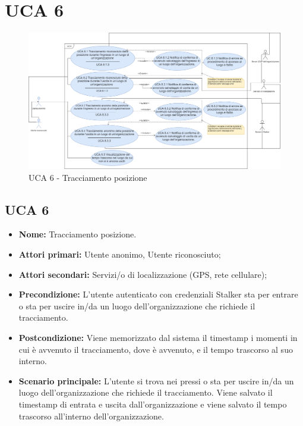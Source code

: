 \newpage
\section{UCA 6}
\begin{figure}[h]
	\centering
	\caption{UCA 6 - Tracciamento posizione}
	\includegraphics[scale=0.28]{sezioni/UseCase/Immagini/UCA8.png}
\end{figure}

\subsection{UCA 6}%
\begin{itemize}
	\item \textbf{Nome:} Tracciamento posizione.
	\item \textbf{Attori primari:} Utente anonimo, Utente riconosciuto;
	\item \textbf{Attori secondari:} Servizi/o di localizzazione (GPS, rete cellulare);
	\item \textbf{Precondizione:} L'utente autenticato con credenziali Stalker sta per entrare o sta per uscire in/da un luogo dell'organizzazione che richiede il tracciamento.
	\item \textbf{Postcondizione:} Viene memorizzato dal sistema il timestamp i momenti in cui è avvenuto il tracciamento, dove è avvenuto, e il tempo trascorso al suo interno.
	\item \textbf{Scenario principale:} L'utente si trova nei pressi o sta per uscire in/da un luogo dell'organizzazione che richiede il tracciamento. Viene salvato il timestamp di entrata e uscita dall'organizzazione e viene salvato il tempo trascorso all'interno dell'organizzazione.
\end{itemize}

